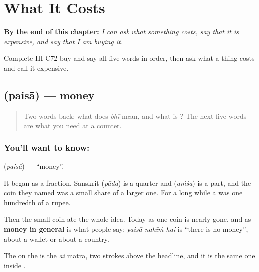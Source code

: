 
\chapter{What It Costs}
\label{ch:hi-what-it-costs}

\begin{chapteropening}
\textbf{By the end of this chapter:} \emph{I can ask what something costs, say that it is expensive, and say that I am buying it.}

Complete HI-C72-buy and say all five words in order, then ask what a thing costs and call it expensive.
\end{chapteropening}

\section[\texorpdfstring{\hi{पैसा} (paisā)}{पैसा (paisā)}]{ (paisā) — money}

\label{lesson:HI-C72-money}



\begin{quote}
Two words back: what does \emph{bhī} mean, and what is \textbf{}? The next five words are what you need at a counter.
\end{quote}

\subsection*{You'll want to know: }
\textbf{} (\emph{paisā}) — \textquotedblleft{}money\textquotedblright{}.

It began as a fraction. Sanskrit  (\emph{pāda}) is a quarter and  (\emph{aṁśa}) is a part, and the coin they named was a small share of a larger one. For a long while a  was one hundredth of a rupee.

Then the small coin ate the whole idea. Today  as one coin is nearly gone, and  as \textbf{money in general} is what people say: \emph{paisā nahīṁ hai} is \textquotedblleft{}there is no money\textquotedblright{}, about a wallet or about a country.

The  on the  is the \emph{ai} matra, two strokes above the headline, and it is the same one inside \textbf{}.

